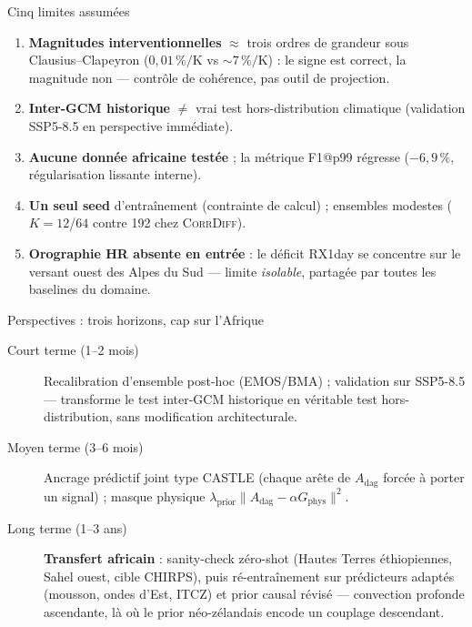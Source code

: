 \documentclass[aspectratio=169,10pt]{beamer}
\newcommand{\CorrDiff}{\textsc{CorrDiff}}
\newcommand{\Adag}{A_{\mathrm{dag}}}
\begin{document}
\begin{frame}{Cinq limites assumées}
  \begin{enumerate}
    \item \textbf{Magnitudes interventionnelles} $\approx$ trois ordres de grandeur sous
          Clausius--Clapeyron ($0{,}01\,\%/\mathrm{K}$ vs $\sim 7\,\%/\mathrm{K}$) :
          le signe est correct, la magnitude non --- contrôle de cohérence, \alert{pas
          outil de projection}.
    \item \textbf{Inter-GCM historique} $\neq$ vrai test hors-distribution climatique
          (validation SSP5-8.5 en perspective immédiate).
    \item \textbf{Aucune donnée africaine testée} ; la métrique F1@p99 régresse
          ($-6{,}9\,\%$, régularisation lissante interne).
    \item \textbf{Un seul seed} d'entraînement (contrainte de calcul) ; ensembles modestes
          ($K = 12$/$64$ contre 192 chez \CorrDiff{}).
    \item \textbf{Orographie HR absente en entrée} : le déficit RX1day se concentre sur
          le versant ouest des Alpes du Sud --- limite \emph{isolable}, partagée par
          toutes les baselines du domaine.
  \end{enumerate}
\end{frame}

\begin{frame}{Perspectives : trois horizons, cap sur l'Afrique}
  \begin{description}
    \item[Court terme (1--2 mois)] Recalibration d'ensemble post-hoc (EMOS/BMA) ;
      validation sur \alert{SSP5-8.5} --- transforme le test inter-GCM historique en
      véritable test hors-distribution, sans modification architecturale.
    \item[Moyen terme (3--6 mois)] Ancrage prédictif joint type CASTLE (chaque arête de
      $\Adag$ forcée à porter un signal) ; masque physique
      $\lambda_{\mathrm{prior}} \|\Adag - \alpha G_{\mathrm{phys}}\|^2$.
    \item[Long terme (1--3 ans)] \textbf{Transfert africain} : sanity-check zéro-shot
      (Hautes Terres éthiopiennes, Sahel ouest, cible CHIRPS), puis ré-entraînement sur
      prédicteurs adaptés (mousson, ondes d'Est, ITCZ) et \alert{prior causal révisé} ---
      convection profonde ascendante, là où le prior néo-zélandais encode un couplage
      descendant.
  \end{description}
\end{frame}
\end{document}
